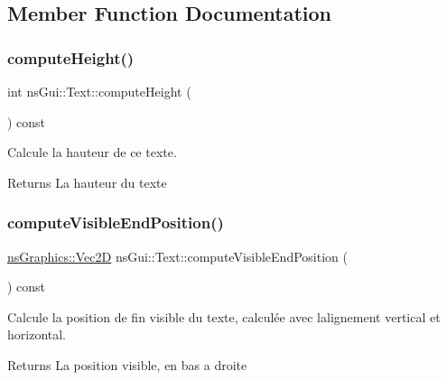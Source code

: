 \subsection{Member Function Documentation}
\mbox{\label{classns_gui_1_1_text_a40e2854b349731f1cdc0574e7297bc50}} 
\subsubsection{\texorpdfstring{compute\+Height()}{computeHeight()}}
{\footnotesize\ttfamily int ns\+Gui\+::\+Text\+::compute\+Height (\begin{DoxyParamCaption}{ }\end{DoxyParamCaption}) const}



Calcule la hauteur de ce texte. 

\begin{DoxyReturn}{Returns}
La hauteur du texte 
\end{DoxyReturn}
\mbox{\label{classns_gui_1_1_text_af8a352a5cb3b4f849eda7badc11fbb31}} 
\subsubsection{\texorpdfstring{compute\+Visible\+End\+Position()}{computeVisibleEndPosition()}}
{\footnotesize\ttfamily \hyperlink{classns_graphics_1_1_vec2_d}{ns\+Graphics\+::\+Vec2D} ns\+Gui\+::\+Text\+::compute\+Visible\+End\+Position (\begin{DoxyParamCaption}{ }\end{DoxyParamCaption}) const}



Calcule la position de fin visible du texte, calculée avec l\textquotesingle{}alignement vertical et horizontal. 

\begin{DoxyReturn}{Returns}
La position visible, en bas a droite 
\end{DoxyReturn}
\mbox{\label{classns_gui_1_1_text_aa05c15547863bb237374487fe9ccfd2e}} 
